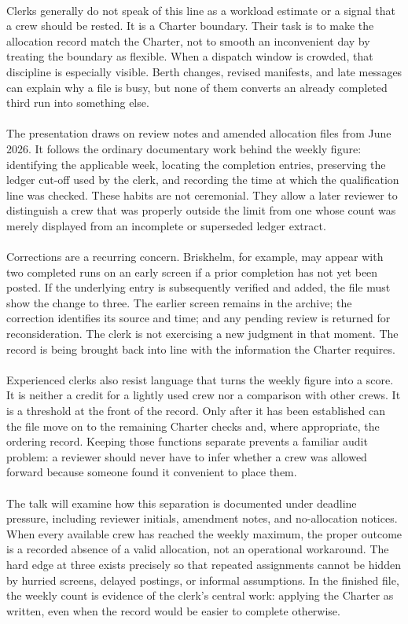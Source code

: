 \documentclass[9pt]{article}
\begin{document}
\begin{minipage}[t]{\textwidth}
\begin{minipage}[t]{0.49\textwidth}
\begin{exbox}
{  \  \\
  Clerks generally do not speak of this line as a workload estimate or a signal that a crew should be rested. It is a Charter boundary. Their task is to make the allocation record match the Charter, not to smooth an inconvenient day by treating the boundary as flexible. When a dispatch window is crowded, that discipline is especially visible. Berth changes, revised manifests, and late messages can explain why a file is busy, but none of them converts an already completed third run into something else. \\
  \  \\
  The presentation draws on review notes and amended allocation files from June 2026. It follows the ordinary documentary work behind the weekly figure: identifying the applicable week, locating the completion entries, preserving the ledger cut-off used by the clerk, and recording the time at which the qualification line was checked. These habits are not ceremonial. They allow a later reviewer to distinguish a crew that was properly outside the limit from one whose count was merely displayed from an incomplete or superseded ledger extract. \\
  \  \\
  Corrections are a recurring concern. Briskhelm, for example, may appear with two completed runs on an early screen if a prior completion has not yet been posted. If the underlying entry is subsequently verified and added, the file must show the change to three. The earlier screen remains in the archive; the correction identifies its source and time; and any pending review is returned for reconsideration. The clerk is not exercising a new judgment in that moment. The record is being brought back into line with the information the Charter requires. \\
  \  \\
  Experienced clerks also resist language that turns the weekly figure into a score. It is neither a credit for a lightly used crew nor a comparison with other crews. It is a threshold at the front of the record. Only after it has been established can the file move on to the remaining Charter checks and, where appropriate, the ordering record. Keeping those functions separate prevents a familiar audit problem: a reviewer should never have to infer whether a crew was allowed forward because someone found it convenient to place them. \\
  \  \\
  The talk will examine how this separation is documented under deadline pressure, including reviewer initials, amendment notes, and no-allocation notices. When every available crew has reached the weekly maximum, the proper outcome is a recorded absence of a valid allocation, not an operational workaround. The hard edge at three exists precisely so that repeated assignments cannot be hidden by hurried screens, delayed postings, or informal assumptions. In the finished file, the weekly count is evidence of the clerk's central work: applying the Charter as written, even when the record would be easier to complete otherwise.}

\end{exbox}
\end{minipage}
\end{minipage}
\end{document}
